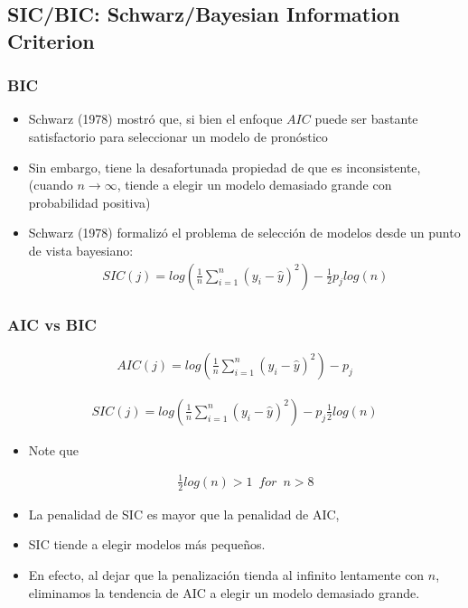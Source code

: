 \documentclass[
  shownotes,
  xcolor={svgnames},
  hyperref={colorlinks,citecolor=DarkBlue,linkcolor=DarkRed,urlcolor=DarkBlue}
  , aspectratio=169]{beamer}
\begin{document}
\subsection{SIC/BIC: Schwarz/Bayesian Information Criterion}
\begin{frame}[fragile]
\frametitle{BIC}
\begin{itemize}
\item Schwarz (1978) mostró que, si bien el enfoque $AIC$ puede ser bastante satisfactorio para seleccionar un modelo de pronóstico
\item Sin embargo, tiene la desafortunada propiedad de que es inconsistente, (cuando $n \rightarrow \infty$, tiende a elegir un modelo demasiado grande con probabilidad positiva)

\item Schwarz (1978) formalizó el problema de selección de modelos desde un punto de vista bayesiano:
\begin{align}
SIC(j) = log \left( \frac{1}{n} \sum_{i=1}^n (y_i - \hat{y} )^2\right) -\frac{1}{2} p_j log(n)
\end{align}


\end{itemize}
\end{frame}
\begin{frame}[fragile]
\frametitle{AIC vs BIC}

\begin{align}
AIC(j) = log \left( \frac{1}{n} \sum_{i=1}^n (y_i - \hat{y} )^2\right)- p_j
\end{align}


\begin{align}
SIC(j) = log \left( \frac{1}{n} \sum_{i=1}^n (y_i - \hat{y} )^2\right) -  p_j \frac{1}{2} log(n)
\end{align}

\begin{itemize}
\item Note que  

\begin{align}
\frac{1}{2} log(n) > 1 \,\,\, for \,\,\, n > 8
\end{align}

 \item La penalidad de SIC es mayor que la penalidad de AIC, 
 \item SIC tiende a elegir modelos más pequeños. 
 \item En efecto, al dejar que la penalización tienda al infinito lentamente con $n$, eliminamos la tendencia de AIC a elegir un modelo demasiado grande.

\end{itemize}
\end{frame}
\end{document}
